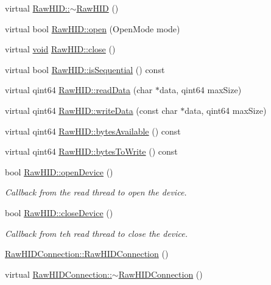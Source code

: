 \begin{DoxyCompactItemize}
\item 
virtual \hyperlink{group___raw_h_i_d_plugin_gaa925a3d3cbb80dd61705cedd4a0d5167}{\-Raw\-H\-I\-D\-::$\sim$\-Raw\-H\-I\-D} ()
\item 
virtual bool \hyperlink{group___raw_h_i_d_plugin_ga58a13b23858ae0b323802154fa2b93a8}{\-Raw\-H\-I\-D\-::open} (\-Open\-Mode mode)
\item 
virtual \hyperlink{group___u_a_v_objects_plugin_ga444cf2ff3f0ecbe028adce838d373f5c}{void} \hyperlink{group___raw_h_i_d_plugin_gad109f6050214525dde9804f5a20bf53f}{\-Raw\-H\-I\-D\-::close} ()
\item 
virtual bool \hyperlink{group___raw_h_i_d_plugin_gaf9b8ab547528829a7ef19c1d9a9e692a}{\-Raw\-H\-I\-D\-::is\-Sequential} () const 
\item 
virtual qint64 \hyperlink{group___raw_h_i_d_plugin_gac4b532c2c57925141897d91434924e80}{\-Raw\-H\-I\-D\-::read\-Data} (char $\ast$data, qint64 max\-Size)
\item 
virtual qint64 \hyperlink{group___raw_h_i_d_plugin_ga59184fec2a68eecf3e08e81303b8cdbe}{\-Raw\-H\-I\-D\-::write\-Data} (const char $\ast$data, qint64 max\-Size)
\item 
virtual qint64 \hyperlink{group___raw_h_i_d_plugin_ga5bd4826624aa1689aedbfd1832c4ddb4}{\-Raw\-H\-I\-D\-::bytes\-Available} () const 
\item 
virtual qint64 \hyperlink{group___raw_h_i_d_plugin_gaf0246fd49e7dc9cda82b983312f4a782}{\-Raw\-H\-I\-D\-::bytes\-To\-Write} () const 
\item 
bool \hyperlink{group___raw_h_i_d_plugin_gafc323c516287e2e1e5e12b425cd28b4b}{\-Raw\-H\-I\-D\-::open\-Device} ()
\begin{DoxyCompactList}\small\item\em \-Callback from the read thread to open the device. \end{DoxyCompactList}\item 
bool \hyperlink{group___raw_h_i_d_plugin_ga6cf706b44d1aaf58b4218b3cacbc6218}{\-Raw\-H\-I\-D\-::close\-Device} ()
\begin{DoxyCompactList}\small\item\em \-Callback from teh read thread to close the device. \end{DoxyCompactList}\item 
\hyperlink{group___raw_h_i_d_plugin_gaa6d75047d32946b3823a1cfe7b4d7328}{\-Raw\-H\-I\-D\-Connection\-::\-Raw\-H\-I\-D\-Connection} ()
\item 
virtual \hyperlink{group___raw_h_i_d_plugin_ga5d3dcc8e69d09013ff84a3412f1ccee7}{\-Raw\-H\-I\-D\-Connection\-::$\sim$\-Raw\-H\-I\-D\-Connection} ()

\end{DoxyCompactItemize}
